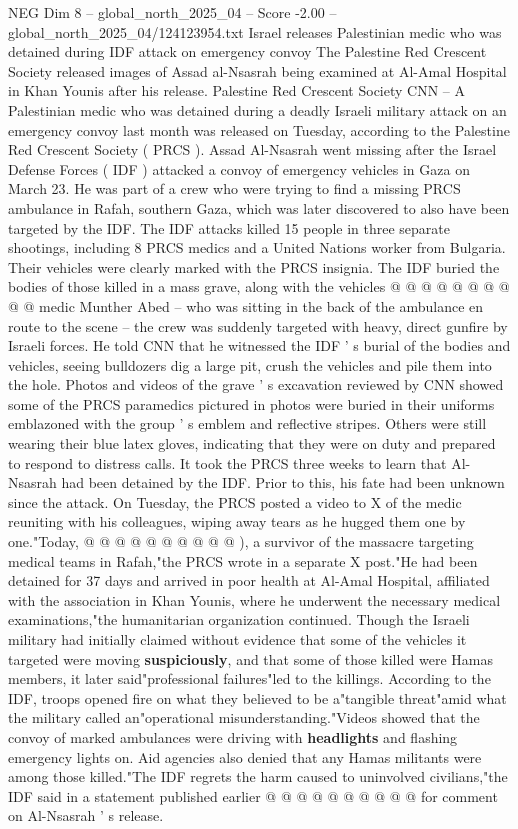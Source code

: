 \begin{textsample}{NEG Dim 8 – global\_north\_2025\_04 – Score -2.00 – global\_north\_2025\_04/124123954.txt}  \label{ex:f8_neg_090}
Israel releases Palestinian medic who was detained during IDF attack on emergency convoy The Palestine Red Crescent Society released images of Assad al-Nsasrah being examined at Al-Amal Hospital in Khan Younis after his release.
Palestine Red Crescent Society CNN -- A Palestinian medic who was detained during a deadly Israeli military attack on an emergency convoy last month was released on Tuesday, according to the Palestine Red Crescent Society ( PRCS ).
Assad Al-Nsasrah went missing after the Israel Defense Forces ( IDF ) attacked a convoy of emergency vehicles in Gaza on March 23.
He was part of a crew who were trying to find a missing PRCS ambulance in Rafah, southern Gaza, which was later discovered to also have been targeted by the IDF.
The IDF attacks killed 15 people in three separate shootings, including 8 PRCS medics and a United Nations worker from Bulgaria.
Their vehicles were clearly marked with the PRCS insignia.
The IDF buried the bodies of those killed in a mass grave, along with the vehicles @ @ @ @ @ @ @ @ @ @ medic Munther Abed -- who was sitting in the back of the ambulance en route to the scene -- the crew was suddenly targeted with heavy, direct gunfire by Israeli forces.
He told CNN that he witnessed the IDF ' s burial of the bodies and vehicles, seeing bulldozers dig a large pit, crush the vehicles and pile them into the hole.
Photos and videos of the grave ' s excavation reviewed by CNN showed some of the PRCS paramedics pictured in photos were buried in their uniforms emblazoned with the group ' s emblem and reflective stripes.
Others were still wearing their blue latex gloves, indicating that they were on duty and prepared to respond to distress calls.
It took the PRCS three weeks to learn that Al-Nsasrah had been detained by the IDF.
Prior to this, his fate had been unknown since the attack.
On Tuesday, the PRCS posted a video to X of the medic reuniting with his colleagues, wiping away tears as he hugged them one by one."Today, @ @ @ @ @ @ @ @ @ @ ), a survivor of the massacre targeting medical teams in Rafah,"the PRCS wrote in a separate X post."He had been detained for 37 days and arrived in poor health at Al-Amal Hospital, affiliated with the association in Khan Younis, where he underwent the necessary medical examinations,"the humanitarian organization continued.
Though the Israeli military had initially claimed without evidence that some of the vehicles it targeted were moving \textbf{suspiciously}, and that some of those killed were Hamas members, it later said"professional failures"led to the killings.
According to the IDF, troops opened fire on what they believed to be a"tangible threat"amid what the military called an"operational misunderstanding."Videos showed that the convoy of marked ambulances were driving with \textbf{headlights} and flashing emergency lights on.
Aid agencies also denied that any Hamas militants were among those killed."The IDF regrets the harm caused to uninvolved civilians,"the IDF said in a statement published earlier @ @ @ @ @ @ @ @ @ @ for comment on Al-Nsasrah ' s release.

\end{textsample}
